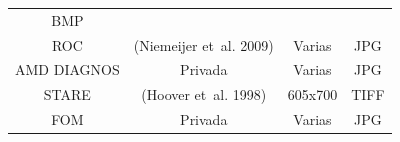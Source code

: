 \documentclass[
  12pt,
  spanish,
  a4paperpaper,
]{report}
\begin{document}
\begin{longtable}[]{@{}cccc@{}}
\begin{minipage}[t]{0.09\columnwidth}
BMP\strut
\end{minipage}\tabularnewline
\begin{minipage}[t]{0.33\columnwidth}\centering
ROC\strut
\end{minipage} & \begin{minipage}[t]{0.33\columnwidth}\centering
(Niemeijer et~al. 2009)\strut
\end{minipage} & \begin{minipage}[t]{0.13\columnwidth}\centering
Varias\strut
\end{minipage} & \begin{minipage}[t]{0.09\columnwidth}\centering
JPG\strut
\end{minipage}\tabularnewline
\begin{minipage}[t]{0.33\columnwidth}\centering
AMD DIAGNOS\strut
\end{minipage} & \begin{minipage}[t]{0.33\columnwidth}\centering
Privada\strut
\end{minipage} & \begin{minipage}[t]{0.13\columnwidth}\centering
Varias\strut
\end{minipage} & \begin{minipage}[t]{0.09\columnwidth}\centering
JPG\strut
\end{minipage}\tabularnewline
\begin{minipage}[t]{0.33\columnwidth}\centering
STARE\strut
\end{minipage} & \begin{minipage}[t]{0.33\columnwidth}\centering
(Hoover et~al. 1998)\strut
\end{minipage} & \begin{minipage}[t]{0.13\columnwidth}\centering
605x700\strut
\end{minipage} & \begin{minipage}[t]{0.09\columnwidth}\centering
TIFF\strut
\end{minipage}\tabularnewline
\begin{minipage}[t]{0.33\columnwidth}\centering
FOM\strut
\end{minipage} & \begin{minipage}[t]{0.33\columnwidth}\centering
Privada\strut
\end{minipage} & \begin{minipage}[t]{0.13\columnwidth}\centering
Varias\strut
\end{minipage} & \begin{minipage}[t]{0.09\columnwidth}\centering
JPG\strut
\end{minipage}\tabularnewline
\bottomrule
\end{longtable}
\end{document}
